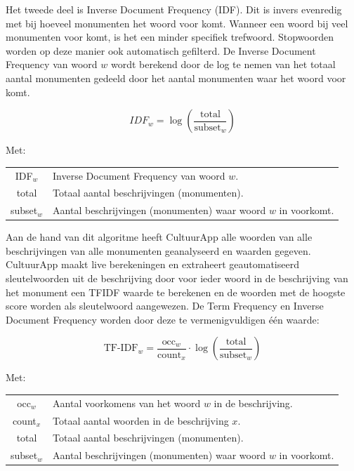 \documentclass[a4paper,10pt]{article}
\begin{document}
		Het tweede deel is Inverse Document Frequency (IDF). Dit is invers evenredig met bij hoeveel monumenten het woord voor komt. Wanneer een woord bij veel monumenten voor komt, is het een minder specifiek trefwoord. Stopwoorden worden op deze manier ook automatisch gefilterd. De Inverse Document Frequency van woord $w$ wordt berekend door de log te nemen van het totaal aantal monumenten gedeeld door het aantal monumenten waar het woord voor komt. 
		
		\begin{equation}
			IDF_w = \log\left({\frac{\text{total}}{\text{subset}_w}}\right)
		\end{equation}
		
		\noindent Met:
		\begin{center}
			\begin{tabular}{ c | l }
				IDF$_w$ & Inverse Document Frequency van woord $w$. \\
			  	total & Totaal aantal beschrijvingen (monumenten). \\
			  	subset$_w$ & Aantal beschrijvingen (monumenten) waar woord $w$ in voorkomt.
			\end{tabular}
		\end{center}
		
		Aan de hand van dit algoritme heeft CultuurApp alle woorden van alle beschrijvingen van alle monumenten geanalyseerd en waarden gegeven. CultuurApp maakt live berekeningen en extraheert geautomatiseerd sleutelwoorden uit de beschrijving door voor ieder woord in de beschrijving van het monument een TFIDF waarde te berekenen en de woorden met de hoogste score worden als sleutelwoord aangewezen. De Term Frequency en Inverse Document Frequency worden door deze te vermenigvuldigen \'e\'en waarde:
		
		\begin{equation}
			\text{TF-IDF}_w =\frac{\text{occ}_w}{\text{count}_x} \cdot  \log\left({\frac{\text{total}}{\text{subset}_w}}\right)
		\end{equation}
		
		\noindent Met:
		\begin{center}
			\begin{tabular}{ c | l }
				occ$_w$ & Aantal voorkomens van het woord $w$ in de beschrijving. \\
			  	count$_x$ & Totaal aantal woorden in de beschrijving $x$.\\
				total & Totaal aantal beschrijvingen (monumenten). \\
			  	subset$_w$ & Aantal beschrijvingen (monumenten) waar woord $w$ in voorkomt.
			\end{tabular}
		\end{center}
		
\end{document}
